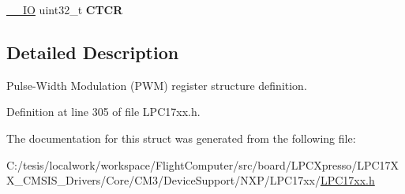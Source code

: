\begin{DoxyCompactItemize}
\item 
\hypertarget{struct_l_p_c___p_w_m___type_def_a0356b1c1af3a9e2d8e093f3f8d5ac02d}{\hyperlink{group___c_m_s_i_s__core__definitions_gaec43007d9998a0a0e01faede4133d6be}{\-\_\-\-\_\-\-I\-O} uint32\-\_\-t {\bfseries \-C\-T\-C\-R}}\label{struct_l_p_c___p_w_m___type_def_a0356b1c1af3a9e2d8e093f3f8d5ac02d}

\end{DoxyCompactItemize}


\subsection{\-Detailed \-Description}
\-Pulse-\/\-Width \-Modulation (\-P\-W\-M) register structure definition. 

\-Definition at line 305 of file \-L\-P\-C17xx.\-h.



\-The documentation for this struct was generated from the following file\-:\begin{DoxyCompactItemize}
\item 
\-C\-:/tesis/localwork/workspace/\-Flight\-Computer/src/board/\-L\-P\-C\-Xpresso/\-L\-P\-C17\-X\-X\-\_\-\-C\-M\-S\-I\-S\-\_\-\-Drivers/\-Core/\-C\-M3/\-Device\-Support/\-N\-X\-P/\-L\-P\-C17xx/\hyperlink{_l_p_c17xx_8h}{\-L\-P\-C17xx.\-h}\end{DoxyCompactItemize}

